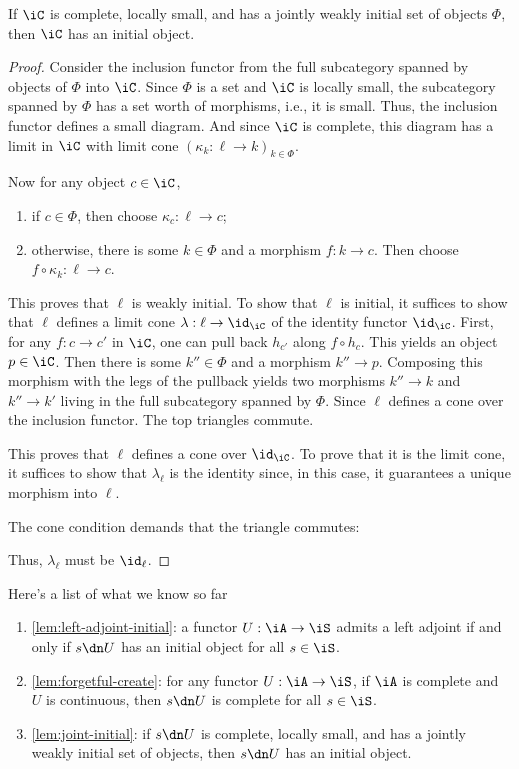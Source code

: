 \documentclass{amsart}
\begin{document}
\begin{lem}\label{lem:joint-initial}
  If $\iC$ is complete, locally small, and has a jointly weakly initial set of objects $\Phi$, then $\iC$ has an initial object.
\end{lem}
\begin{proof}
  Consider the inclusion functor from the full subcategory spanned by objects of $\Phi$ into $\iC$.
  Since $\Phi$ is a set and $\iC$ is locally small, the subcategory spanned by $\Phi$ has a set worth of morphisms, i.e., it is small.
  Thus, the inclusion functor defines a small diagram.
  And since $\iC$ is complete, this diagram has a limit in $\iC$ with limit cone $(\kappa_{k} : \ell \to k)_{k \in \Phi}$.
  
  Now for any object $c \in \iC$,
  \begin{enumerate}
  \item if $c \in \Phi$, then choose $\kappa_{c} : \ell \to c$;
  \item otherwise, there is some $k \in \Phi$ and a morphism $f : k \to c$.
    Then choose $f \circ \kappa_{k} : \ell \to c$.
  \end{enumerate}
  This proves that $\ell$ is weakly initial.
  To show that $\ell$ is initial, it suffices to show that $\ell$ defines a limit cone $\lambda : \ell \to \id_{\iC}$ of the identity functor $\id_{\iC}$.
  First, for any $f : c \to c'$ in $\iC$, one can pull back $h_{c'}$ along $f \circ h_{c}$.
  This yields an object $p \in \iC$.
  Then there is some $k'' \in \Phi$ and a morphism $k'' \to p$.
  Composing this morphism with the legs of the pullback yields two morphisms $k'' \to k$ and $k'' \to k'$ living in the full subcategory spanned by $\Phi$.
  Since $\ell$ defines a cone over the inclusion functor.
  The top triangles commute.
  
  This proves that $\ell$ defines a cone over $\id_{\iC}$.
  To prove that it is the limit cone, it suffices to show that $\lambda_{\ell}$ is the identity since, in this case, it guarantees a unique morphism into $\ell$.
  
  The cone condition demands that the triangle commutes:
  
  Thus, $\lambda_{\ell}$ must be $\id_{\ell}$.
\end{proof}

Here's a list of what we know so far
\begin{enumerate}
\item \cref{lem:left-adjoint-initial}: a functor $U : \iA \to \iS$ admits a left adjoint if and only if $s \dn U$ has an initial object for all $s \in \iS$.
\item \cref{lem:forgetful-create}: for any functor $U : \iA \to \iS$, if $\iA$ is complete and $U$ is continuous, then $s \dn U$ is complete for all $s \in \iS$.
\item \cref{lem:joint-initial}: if $s \dn U$ is complete, locally small, and has a jointly weakly initial set of objects, then $s \dn U$ has an initial object.
\end{enumerate}
\end{document}
